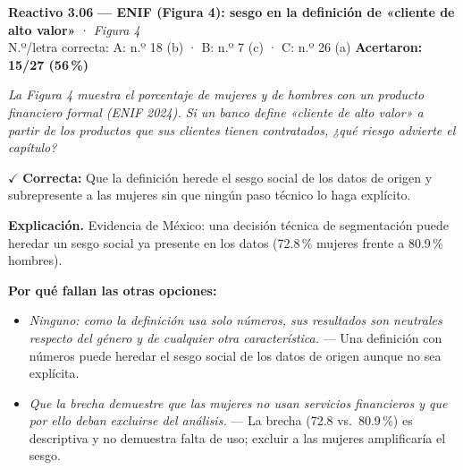 \documentclass[10pt,letterpaper]{article}
\begin{document}
\begin{minipage}{\textwidth}
{\color{guinda}\textbf{Reactivo 3.06}} \textbf{— ENIF (Figura 4): sesgo en la definición de «cliente de alto valor»} · \textit{Figura 4}\\[-1pt]
{\scriptsize N.º/letra correcta: A: n.º 18 (b) · B: n.º 7 (c) · C: n.º 26 (a) \hfill \textbf{Acertaron: 15/27 (56\,\%)}}

\textit{La Figura 4 muestra el porcentaje de mujeres y de hombres con un producto financiero formal (ENIF 2024). Si un banco define «cliente de alto valor» a partir de los productos que sus clientes tienen contratados, ¿qué riesgo advierte el capítulo?}

\textcolor{verde}{$\checkmark$} \textbf{Correcta:} Que la definición herede el sesgo social de los datos de origen y subrepresente a las mujeres sin que ningún paso técnico lo haga explícito.

\textbf{Explicación.} Evidencia de México: una decisión técnica de segmentación puede heredar un sesgo social ya presente en los datos (72.8\,\% mujeres frente a 80.9\,\% hombres).

\textbf{Por qué fallan las otras opciones:}
\begin{itemize}[itemsep=0pt,topsep=1pt,leftmargin=1.3em,parsep=0pt]
\item[\textcolor{rojo}{$\times$}] \textit{Ninguno: como la definición usa solo números, sus resultados son neutrales respecto del género y de cualquier otra característica.} --- Una definición con números puede heredar el sesgo social de los datos de origen aunque no sea explícita.
\item[\textcolor{rojo}{$\times$}] \textit{Que la brecha demuestre que las mujeres no usan servicios financieros y que por ello deban excluirse del análisis.} --- La brecha (72.8 vs.\ 80.9\,\%) es descriptiva y no demuestra falta de uso; excluir a las mujeres amplificaría el sesgo.
\end{itemize}
\end{minipage}\par\vspace{5pt}{\color{gray!40}\hrule}\vspace{5pt}
\end{document}
